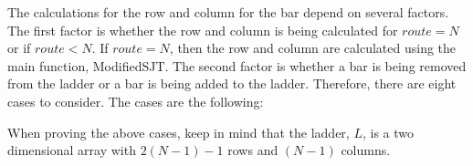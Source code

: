 The calculations for the row and column for the bar 
depend on several factors. The first factor is whether the row and column is being calculated for $route=N$ or 
if $route < N$. If $route=N$, then the row and column are calculated using the main function, ModifiedSJT. The second factor 
is whether a bar is being removed from the ladder or a bar is being added to the ladder. Therefore, there are eight cases 
to consider. The cases are the following: 
\begin{caseof}
\end{caseof}


When proving the above cases, keep in mind that the ladder, $L$, is a two dimensional array with $2(N-1)-1$ rows and $(N-1)$ columns.

